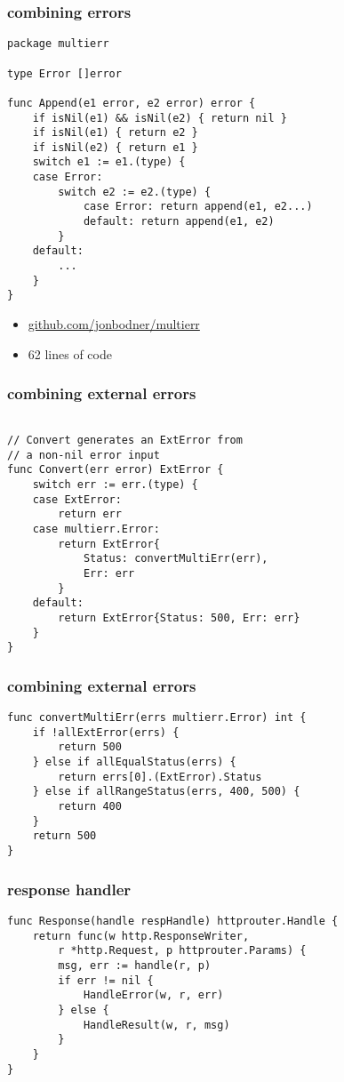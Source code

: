 \documentclass{beamer}
\begin{document}
\begin{frame}[fragile]
\frametitle{combining errors}
\begin{lstlisting}[basicstyle=\ttfamily\footnotesize]
package multierr

type Error []error

func Append(e1 error, e2 error) error {
	if isNil(e1) && isNil(e2) { return nil }
	if isNil(e1) { return e2 }
	if isNil(e2) { return e1 }
	switch e1 := e1.(type) {
	case Error:
		switch e2 := e2.(type) {
			case Error: return append(e1, e2...)
			default: return append(e1, e2)
		}
	default:
		...
	}
}
\end{lstlisting}
\begin{itemize}
\item \href{https://github.com/jonbodner/multierr}{github.com/jonbodner/multierr}
\item 62 lines of code
\end{itemize}
\end{frame}

\begin{frame}[fragile]
\frametitle{combining external errors}
\begin{lstlisting}[basicstyle=\ttfamily\footnotesize]

// Convert generates an ExtError from
// a non-nil error input
func Convert(err error) ExtError {
	switch err := err.(type) {
	case ExtError:
		return err
	case multierr.Error:
		return ExtError{
			Status: convertMultiErr(err),
			Err: err
		}
	default:
		return ExtError{Status: 500, Err: err}
	}
}
\end{lstlisting}
\end{frame}

\begin{frame}[fragile]
\frametitle{combining external errors}
\begin{lstlisting}[basicstyle=\ttfamily\footnotesize]
func convertMultiErr(errs multierr.Error) int {
	if !allExtError(errs) {
		return 500
	} else if allEqualStatus(errs) {
		return errs[0].(ExtError).Status
	} else if allRangeStatus(errs, 400, 500) {
		return 400
	}
	return 500
}
\end{lstlisting}
\end{frame}

\begin{frame}[fragile]
\frametitle{response handler}
\begin{lstlisting}[basicstyle=\ttfamily\footnotesize]
func Response(handle respHandle) httprouter.Handle {
	return func(w http.ResponseWriter,
		r *http.Request, p httprouter.Params) {
		msg, err := handle(r, p)
		if err != nil {
			HandleError(w, r, err)
		} else {
			HandleResult(w, r, msg)
		}
	}
}
\end{lstlisting}
\end{frame}
\end{document}
